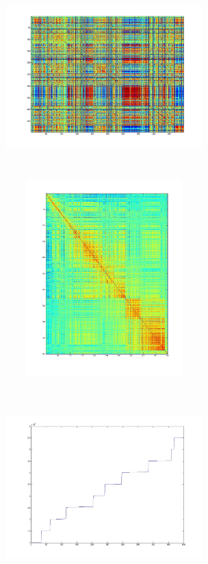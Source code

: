 \includegraphics[width=3in,height=3in]{images/RealTimeFinancialTSMining/spy_day_price_corr.jpg}
\includegraphics[width=3in,height=3in]{images/RealTimeFinancialTSMining/spy_wk_price_corr.jpg}

\includegraphics[width=3in,height=3in]{images/RealTimeFinancialTSMining/spy_industrycodes_corr.jpg}

